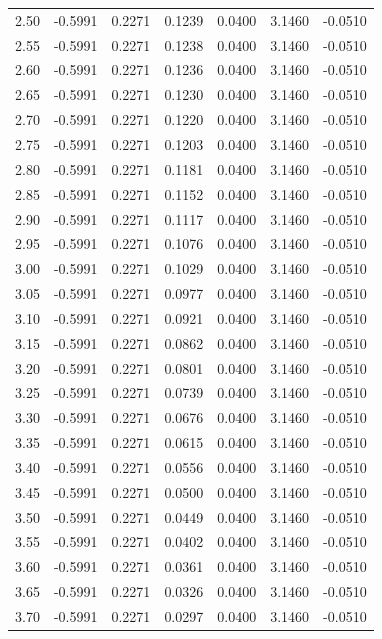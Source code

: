 \begin{longtable}{|c|c|c|c|c|c|c|}
2.50 & -0.5991 & 0.2271 & 0.1239 & 0.0400 & 3.1460 & -0.0510 \\
2.55 & -0.5991 & 0.2271 & 0.1238 & 0.0400 & 3.1460 & -0.0510 \\
2.60 & -0.5991 & 0.2271 & 0.1236 & 0.0400 & 3.1460 & -0.0510 \\
2.65 & -0.5991 & 0.2271 & 0.1230 & 0.0400 & 3.1460 & -0.0510 \\
2.70 & -0.5991 & 0.2271 & 0.1220 & 0.0400 & 3.1460 & -0.0510 \\
2.75 & -0.5991 & 0.2271 & 0.1203 & 0.0400 & 3.1460 & -0.0510 \\
2.80 & -0.5991 & 0.2271 & 0.1181 & 0.0400 & 3.1460 & -0.0510 \\
2.85 & -0.5991 & 0.2271 & 0.1152 & 0.0400 & 3.1460 & -0.0510 \\
2.90 & -0.5991 & 0.2271 & 0.1117 & 0.0400 & 3.1460 & -0.0510 \\
2.95 & -0.5991 & 0.2271 & 0.1076 & 0.0400 & 3.1460 & -0.0510 \\
3.00 & -0.5991 & 0.2271 & 0.1029 & 0.0400 & 3.1460 & -0.0510 \\
3.05 & -0.5991 & 0.2271 & 0.0977 & 0.0400 & 3.1460 & -0.0510 \\
3.10 & -0.5991 & 0.2271 & 0.0921 & 0.0400 & 3.1460 & -0.0510 \\
3.15 & -0.5991 & 0.2271 & 0.0862 & 0.0400 & 3.1460 & -0.0510 \\
3.20 & -0.5991 & 0.2271 & 0.0801 & 0.0400 & 3.1460 & -0.0510 \\
3.25 & -0.5991 & 0.2271 & 0.0739 & 0.0400 & 3.1460 & -0.0510 \\
3.30 & -0.5991 & 0.2271 & 0.0676 & 0.0400 & 3.1460 & -0.0510 \\
3.35 & -0.5991 & 0.2271 & 0.0615 & 0.0400 & 3.1460 & -0.0510 \\
3.40 & -0.5991 & 0.2271 & 0.0556 & 0.0400 & 3.1460 & -0.0510 \\
3.45 & -0.5991 & 0.2271 & 0.0500 & 0.0400 & 3.1460 & -0.0510 \\
3.50 & -0.5991 & 0.2271 & 0.0449 & 0.0400 & 3.1460 & -0.0510 \\
3.55 & -0.5991 & 0.2271 & 0.0402 & 0.0400 & 3.1460 & -0.0510 \\
3.60 & -0.5991 & 0.2271 & 0.0361 & 0.0400 & 3.1460 & -0.0510 \\
3.65 & -0.5991 & 0.2271 & 0.0326 & 0.0400 & 3.1460 & -0.0510 \\
3.70 & -0.5991 & 0.2271 & 0.0297 & 0.0400 & 3.1460 & -0.0510 \\

\end{longtable}
